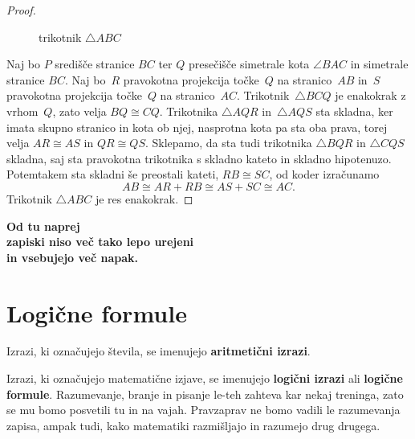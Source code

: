 \begin{proof}
\begin{figure}[ht]
\begin{center}
\end{center}
    \caption{trikotnik $\triangle ABC$}
    \label{fig:trikotnik}
  \end{figure}
  Naj bo $P$ središče stranice $BC$ ter $Q$ presečišče simetrale kota $\angle BAC$ in simetrale stranice $BC$.
  Naj bo~$R$ pravokotna projekcija točke~$Q$ na stranico~$AB$ in~$S$ pravokotna projekcija točke~$Q$ na stranico~$AC$.
  Trikotnik~$\triangle BCQ$ je enakokrak z vrhom~$Q$, zato velja $BQ \cong CQ$.
  Trikotnika $\triangle AQR$ in~$\triangle AQS$ sta skladna, ker imata skupno stranico in kota ob njej, nasprotna kota pa sta oba prava, torej velja $AR \cong AS$ in $QR \cong QS$.
  Sklepamo, da sta tudi trikotnika $\triangle BQR$ in $\triangle CQS$ skladna, saj sta pravokotna trikotnika s skladno kateto in skladno hipotenuzo. Potemtakem sta skladni še preostali kateti, $RB \cong SC$, od koder izračunamo
  \begin{equation*}
    AB \cong AR + RB \cong AS + SC \cong AC.
  \end{equation*}
  Trikotnik $\triangle ABC$ je res enakokrak.
\end{proof}

\clearpage
\newpage
\hbox{}
\vfill
\begin{center}
  \LARGE
  \textbf{Od tu naprej \\ zapiski niso več tako lepo urejeni \\ in vsebujejo več napak.}
\end{center}
\vfill
\hbox{}
\newpage

\section{Logične formule}

Izrazi, ki označujejo števila, se imenujejo \textbf{aritmetični izrazi}.

Izrazi, ki označujejo matematične izjave, se imenujejo \textbf{logični izrazi} ali \textbf{logične formule}. Razumevanje, branje in pisanje le-teh zahteva kar nekaj treninga, zato se mu bomo posvetili tu in na vajah. Pravzaprav ne bomo vadili le razumevanja zapisa, ampak tudi, kako matematiki razmišljajo in razumejo drug drugega.

